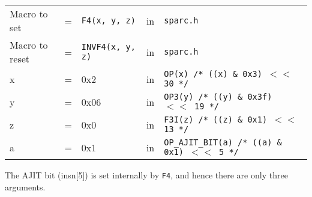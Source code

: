 \begin{enumerate}
  \begin{tabular}[h]{lclcl}
    Macro to set  &=& \texttt{F4(x, y, z)} &in& \texttt{sparc.h}     \\
    Macro to reset  &=& \texttt{INVF4(x, y, z)} &in& \texttt{sparc.h}     \\
    x &=& 0x2      &in& \texttt{OP(x)  /* ((x) \& 0x3)  $<<$ 30 */} \\
    y &=& 0x06     &in& \texttt{OP3(y) /* ((y) \& 0x3f) $<<$ 19 */} \\
    z &=& 0x0      &in& \texttt{F3I(z) /* ((z) \& 0x1)  $<<$ 13 */} \\
    a &=& 0x1      &in& \texttt{OP\_AJIT\_BIT(a) /* ((a) \& 0x1)  $<<$ 5 */}
  \end{tabular}

  The AJIT bit  (insn[5]) is set internally by  \texttt{F4}, and hence
  there are only three arguments.


\end{enumerate}
